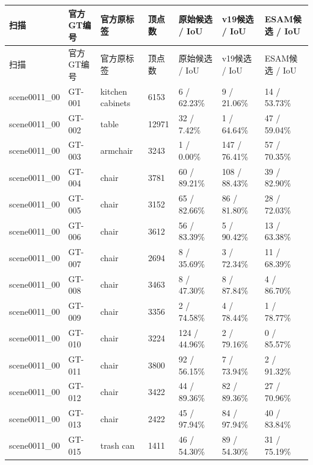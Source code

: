 \documentclass[UTF8,fontset=fandol]{ctexart}
\begin{document}
{\small
\begin{longtable}{|p{}|p{}|p{}|p{}|p{}|p{}|p{}|}
\hline
扫描 & 官方GT编号 & 官方原标签 & 顶点数 & 原始候选 / IoU & v19候选 / IoU & ESAM候选 / IoU \\ \hline
\endfirsthead
\hline
扫描 & 官方GT编号 & 官方原标签 & 顶点数 & 原始候选 / IoU & v19候选 / IoU & ESAM候选 / IoU \\ \hline
\endhead
scene0011\_00 & GT-001 & kitchen cabinets & 6153 & 6 / 62.23\% & 9 / 21.06\% & 14 / 53.73\% \\ \hline
scene0011\_00 & GT-002 & table & 12971 & 32 / 7.42\% & 1 / 64.64\% & 47 / 59.04\% \\ \hline
scene0011\_00 & GT-003 & armchair & 3243 & 1 / 0.00\% & 147 / 76.41\% & 57 / 70.35\% \\ \hline
scene0011\_00 & GT-004 & chair & 3781 & 60 / 89.21\% & 108 / 88.43\% & 39 / 82.90\% \\ \hline
scene0011\_00 & GT-005 & chair & 3152 & 65 / 82.66\% & 86 / 81.80\% & 28 / 72.03\% \\ \hline
scene0011\_00 & GT-006 & chair & 3612 & 56 / 83.39\% & 5 / 90.42\% & 13 / 63.38\% \\ \hline
scene0011\_00 & GT-007 & chair & 2694 & 8 / 35.69\% & 3 / 72.34\% & 11 / 68.39\% \\ \hline
scene0011\_00 & GT-008 & chair & 3463 & 8 / 47.30\% & 8 / 87.84\% & 4 / 86.70\% \\ \hline
scene0011\_00 & GT-009 & chair & 3356 & 2 / 74.58\% & 4 / 78.44\% & 1 / 78.77\% \\ \hline
scene0011\_00 & GT-010 & chair & 3224 & 124 / 44.96\% & 2 / 79.16\% & 0 / 85.57\% \\ \hline
scene0011\_00 & GT-011 & chair & 3800 & 92 / 56.15\% & 7 / 73.94\% & 2 / 91.32\% \\ \hline
scene0011\_00 & GT-012 & chair & 3422 & 44 / 89.36\% & 82 / 89.36\% & 27 / 70.96\% \\ \hline
scene0011\_00 & GT-013 & chair & 2422 & 45 / 97.94\% & 84 / 97.94\% & 40 / 83.84\% \\ \hline
scene0011\_00 & GT-015 & trash can & 1411 & 46 / 54.30\% & 89 / 54.30\% & 31 / 75.19\% \\ \hline

\end{longtable}}
\end{document}
